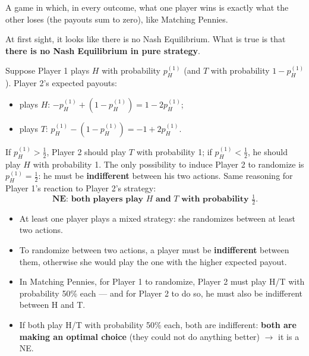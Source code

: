 \documentclass[11pt,a4paper,openany]{book}
\begin{document}
\begin{defnbox}[title=Zero sum game]
A game in which, in every outcome, what one player wins is exactly what the other loses
(the payouts sum to zero), like Matching Pennies.
\end{defnbox}

\begin{warnbox}[title=No pure-strategy NE]
At first sight, it looks like there is no Nash Equilibrium. What is true is that
\textbf{there is no Nash Equilibrium in pure strategy}.
\end{warnbox}


\begin{propbox}[title=Mixed-strategy NE of Matching Pennies]
Suppose Player 1 plays $H$ with probability $p_H^{(1)}$ (and $T$ with probability
$1 - p_H^{(1)}$). Player 2's expected payouts:
\begin{itemize}
  \item plays $H$: $-p_H^{(1)} + (1 - p_H^{(1)}) = 1 - 2p_H^{(1)}$;
  \item plays $T$: $p_H^{(1)} - (1 - p_H^{(1)}) = -1 + 2p_H^{(1)}$.
\end{itemize}
If $p_H^{(1)} > \frac12$, Player 2 should play $T$ with probability 1; if
$p_H^{(1)} < \frac12$, he should play $H$ with probability 1. The only possibility to induce
Player 2 to randomize is $p_H^{(1)} = \frac12$: he must be \textbf{indifferent} between his
two actions. Same reasoning for Player 1's reaction to Player 2's strategy:
\[
\textbf{NE: both players play } H \textbf{ and } T \textbf{ with probability } \tfrac12.
\]
\end{propbox}

\begin{keybox}[title=Logic of a mixed-strategy equilibrium]
\begin{itemize}
  \item At least one player plays a mixed strategy: she randomizes between at least two
        actions.
  \item To randomize between two actions, a player must be \textbf{indifferent} between
        them, otherwise she would play the one with the higher expected payout.
  \item In Matching Pennies, for Player 1 to randomize, Player 2 must play H/T with
        probability 50\% each --- and for Player 2 to do so, he must also be indifferent
        between H and T.
  \item If both play H/T with probability 50\% each, both are indifferent: \textbf{both are
        making an optimal choice} (they could not do anything better) $\rightarrow$ it is a
        NE.
\end{itemize}
\end{keybox}
\end{document}
